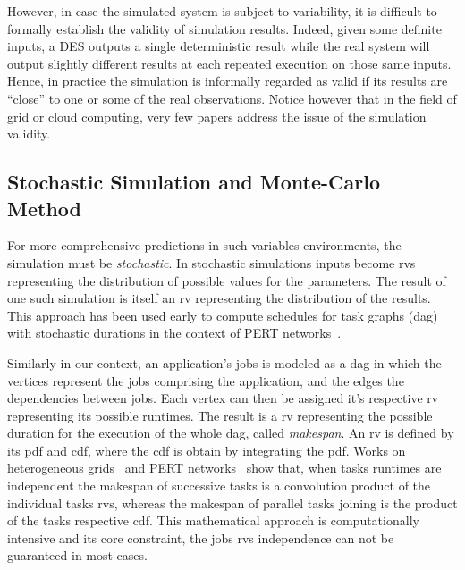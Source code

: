 \documentclass[10pt,conference,compsocconf]{IEEEtran}
\begin{document}
However, in case the simulated system is subject to variability, it is difficult
to formally  establish the  validity of simulation  results. Indeed,  given some
definite inputs,  a DES  outputs a  single deterministic  result while  the real
system  will output  slightly different  results at  each repeated  execution on
those same inputs.  Hence, in practice  the simulation is informally regarded as
valid if  its results  are ``close'' to  one or some  of the  real observations.
Notice however  that in the  field of grid or  cloud computing, very  few papers
address the issue of the simulation validity.

\subsection{Stochastic Simulation and Monte-Carlo Method}

For  more   comprehensive  predictions  in  such   variables  environments,  the
simulation must  be \emph{stochastic}.  In stochastic simulations  inputs become
\acfp{rv} representing the  distribution of possible values  for the parameters.
The  result  of one  such  simulation  is  itself  an \ac{rv}  representing  the
distribution  of the  results.  This  approach has  been used  early to  compute
schedules for task graphs (\ac{dag}) with stochastic durations in the context of
PERT networks~\cite{Slyke63}.


Similarly in  our context,  an application's  jobs is modeled  as a  \ac{dag} in
which the vertices represent the jobs  comprising the application, and the edges
the dependencies between jobs.  Each vertex can then be assigned it's respective
\ac{rv}  representing   its  possible  runtimes.    The  result  is   a  \ac{rv}
representing  the possible  duration for  the execution  of the  whole \ac{dag},
called  \emph{makespan}. An  \ac{rv} is  defined by  its \ac{pdf}  and \ac{cdf},
where  the   \ac{cdf}  is  obtain   by  integrating  the  \ac{pdf}.    Works  on
heterogeneous  grids~\cite{Li97} and  PERT  networks~\cite{Ludwig01} show  that,
when  tasks runtimes  are  independent the  makespan of  successive  tasks is  a
convolution product  of the individual  tasks \acp{rv}, whereas the  makespan of
parallel tasks  joining is the  product of  the tasks respective  \ac{cdf}. This
mathematical approach is computationally intensive  and its core constraint, the
jobs \acp{rv} independence can not be guaranteed in most cases.
\end{document}

